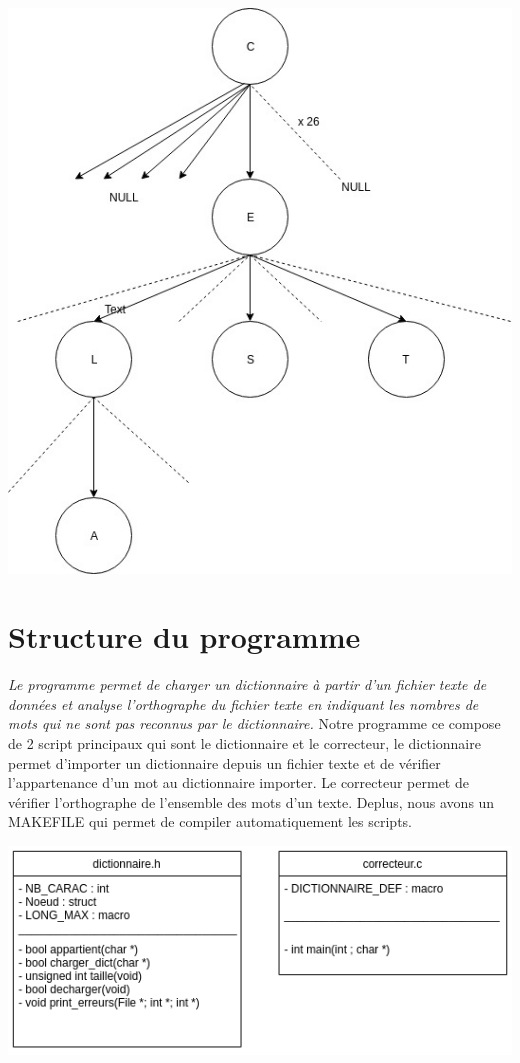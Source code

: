 \documentclass[12pt]{article}
\begin{document}
\includegraphics[scale=0.6]{structure2.jpeg}



\newpage

\section{Structure du programme}
\textit{Le programme permet de charger un dictionnaire à partir d'un fichier texte de données et analyse l'orthographe du fichier texte en indiquant les nombres de mots qui ne sont pas reconnus par le dictionnaire.}
\newline
\newline
Notre programme ce compose de 2 script principaux qui sont le dictionnaire et le correcteur, le dictionnaire permet d'importer un dictionnaire depuis un fichier texte et de vérifier l'appartenance d'un mot au dictionnaire importer. Le correcteur permet de vérifier l'orthographe de l'ensemble des mots d'un texte. Deplus, nous avons un MAKEFILE qui permet de compiler automatiquement les scripts.
\newline

\includegraphics[scale=0.6]{structprg.png}
\end{document}
